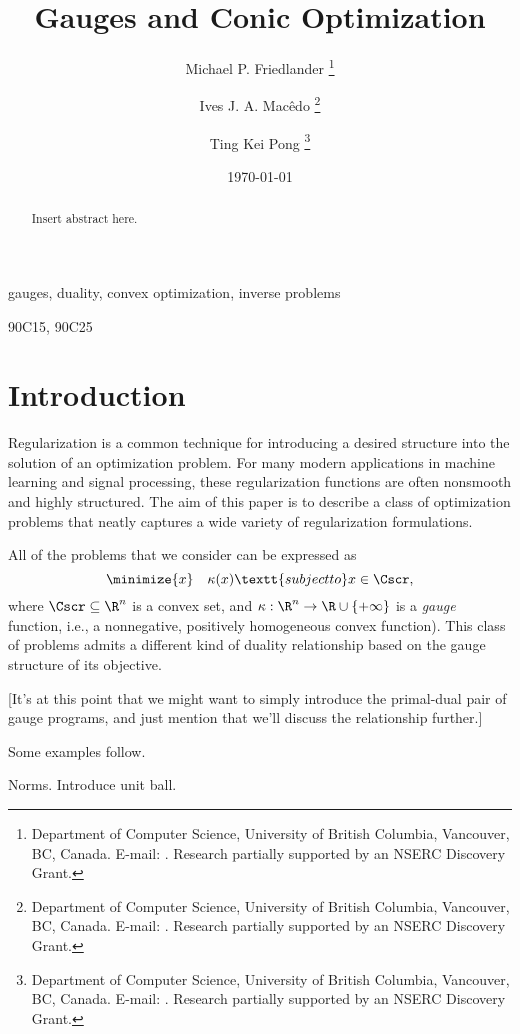 \documentclass{siamltex}   %
\title{
  Gauges and Conic Optimization
}
\author{
  Michael P. Friedlander%
  \thanks{%
    Department of Computer Science,
    University of British Columbia,
    Vancouver, BC, Canada.
    E-mail: \mailto{mpf@cs.ubc.ca}.
    Research partially supported by an NSERC Discovery Grant.
  }
  \and
  Ives J. A. Mac\^edo%
  \thanks{%
    Department of Computer Science,
    University of British Columbia,
    Vancouver, BC, Canada.
    E-mail: \mailto{ijamj@cs.ubc.ca}.
    Research partially supported by an NSERC Discovery Grant.
  }
  \and
  Ting Kei Pong%
  \thanks{%
    Department of Computer Science,
    University of British Columbia,
    Vancouver, BC, Canada.
    E-mail: \mailto{tkpong@cs.ubc.ca}.
    Research partially supported by an NSERC Discovery Grant.
  }
}
\date{\today}
\begin{document}
  \maketitle

  \thispagestyle{plain}
  \pagestyle{myheadings}

  \begin{abstract}
    Insert abstract here.
  \end{abstract}
  \begin{keywords}
    gauges, duality, convex optimization, inverse problems
  \end{keywords}
  \begin{AMS}
    90C15, 90C25
  \end{AMS}

  \tableofcontents
  \listoftodos\relax


  \section{Introduction}

  Regularization is a common technique for introducing a desired
  structure into the solution of an optimization problem. For many
  modern applications in machine learning and signal processing, these
  regularization functions are often nonsmooth and highly
  structured. The aim of this paper is to describe a class of
  optimization problems that neatly captures a wide variety of
  regularization formulations.

  All of the problems that we consider can be expressed as
  \begin{equation}
    \label{eq:1}
    \minimize{x} \quad \kappa(x) \textt{subject to} x\in\Cscr,
  \end{equation}
  where $\Cscr\subseteq\R^{n}$ is a convex set, and
  $\kappa:\R^{n}\to\R\cup\{+\infty\}$ is a \emph{gauge} function,
  i.e., a nonnegative, positively homogeneous convex function). This
  class of problems admits a different kind of duality relationship
  based on the gauge structure of its objective.

  [It's at this point that we might want to simply introduce the
  primal-dual pair of gauge programs, and just mention that we'll
  discuss the relationship further.]

  Some examples follow.
  \begin{example}
    Norms. Introduce unit ball.
  \end{example}
\end{document}
